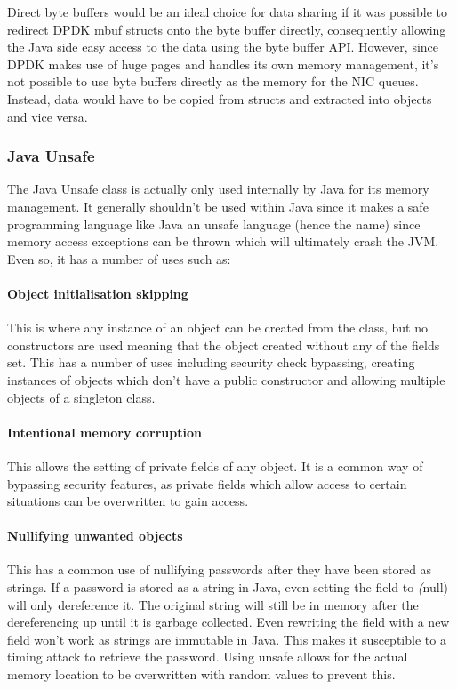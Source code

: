 \documentclass[final_report.tex]{subfiles}
\begin{document}
Direct byte buffers would be an ideal choice for data sharing if it was possible to redirect DPDK mbuf structs onto the byte buffer directly, consequently allowing the Java side easy access to the data using the byte buffer API. However, since DPDK makes use of huge pages and handles its own memory management, it's not possible to use byte buffers directly as the memory for the NIC queues. Instead, data would have to be copied from structs and extracted into objects and vice versa.

\subsubsection{Java Unsafe}
The Java Unsafe class is actually only used internally by Java for its memory management. It generally shouldn't be used within Java since it makes a safe programming language like Java an unsafe language (hence the name) since memory access exceptions can be thrown which will ultimately crash the JVM. Even so, it has a number of uses such as:

\paragraph*{Object initialisation skipping}
This is where any instance of an object can be created from the class, but no constructors are used meaning that the object created without any of the fields set. This has a number of uses including security check bypassing, creating instances of objects which don't have a public constructor and allowing multiple objects of a singleton class.

\paragraph*{Intentional memory corruption}
This allows the setting of private fields of any object. It is a common way of bypassing security features, as private fields which allow access to certain situations can be overwritten to gain access.

\paragraph*{Nullifying unwanted objects}
This has a common use of nullifying passwords after they have been stored as strings. If a password is stored as a string in Java, even setting the field to \textit(null) will only dereference it. The original string will still be in memory after the dereferencing up until it is garbage collected. Even rewriting the field with a new field won't work as strings are immutable in Java. This makes it susceptible to a timing attack to retrieve the password. Using unsafe allows for the actual memory location to be overwritten with random values to prevent this.
\end{document}
